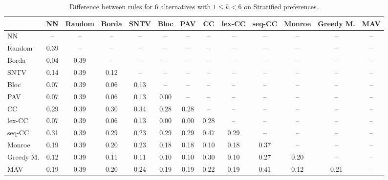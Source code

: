 
\begin{table*}[h!]
\centering
\begin{tabular}{lcccccccccccc}
\toprule
 & NN & Random & Borda & SNTV & Bloc & PAV & CC & lex-CC & seq-CC & Monroe & Greedy M. & MAV \\
\midrule
NN & -- & -- & -- & -- & -- & -- & -- & -- & -- & -- & -- & -- \\
Random & 0.39 & -- & -- & -- & -- & -- & -- & -- & -- & -- & -- & -- \\
Borda & 0.04 & 0.39 & -- & -- & -- & -- & -- & -- & -- & -- & -- & -- \\
SNTV & 0.14 & 0.39 & 0.12 & -- & -- & -- & -- & -- & -- & -- & -- & -- \\
Bloc & 0.07 & 0.39 & 0.06 & 0.13 & -- & -- & -- & -- & -- & -- & -- & -- \\
PAV & 0.07 & 0.39 & 0.06 & 0.13 & 0.00 & -- & -- & -- & -- & -- & -- & -- \\
CC & 0.29 & 0.39 & 0.30 & 0.34 & 0.28 & 0.28 & -- & -- & -- & -- & -- & -- \\
lex-CC & 0.07 & 0.39 & 0.06 & 0.13 & 0.00 & 0.00 & 0.28 & -- & -- & -- & -- & -- \\
seq-CC & 0.31 & 0.39 & 0.29 & 0.23 & 0.29 & 0.29 & 0.47 & 0.29 & -- & -- & -- & -- \\
Monroe & 0.19 & 0.39 & 0.20 & 0.23 & 0.18 & 0.18 & 0.10 & 0.18 & 0.37 & -- & -- & -- \\
Greedy M. & 0.12 & 0.39 & 0.11 & 0.11 & 0.10 & 0.10 & 0.30 & 0.10 & 0.27 & 0.20 & -- & -- \\
MAV & 0.19 & 0.39 & 0.20 & 0.24 & 0.19 & 0.19 & 0.22 & 0.19 & 0.41 & 0.12 & 0.21 & -- \\
\bottomrule
\end{tabular}

\caption{Difference between rules for 6 alternatives with $1 \leq k < 6$ on Stratified preferences.}
\end{table*}
